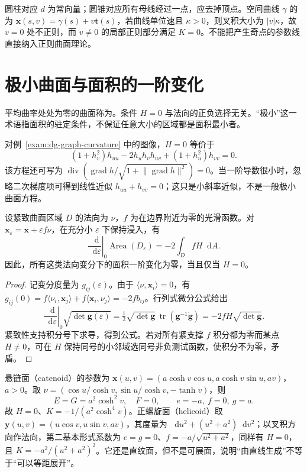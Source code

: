 \documentclass[UTF8,12pt,a4paper,fontset=fandol]{ctexbook}
\newcommand{\dd}{\mathop{}\!\mathrm d}
\newcommand{\ip}[2]{\langle #1,#2\rangle}
\newcommand{\norm}[1]{\lVert #1\rVert}
\DeclareMathOperator{\tr}{tr}
\DeclareMathOperator{\grad}{grad}
\begin{document}
圆柱对应 $d$ 为常向量；圆锥对应所有母线经过一点，应去掉顶点。空间曲线 $\gamma$ 的为 $\mathbf x(s,v)=\gamma(s)+v\mathbf t(s)$，若曲线单位速且 $\kappa>0$，则叉积大小为 $|v|\kappa$，故 $v=0$ 处不正则，而 $v\ne0$ 的局部正则部分满足 $K=0$。不能把产生奇点的参数线直接纳入正则曲面理论。

\section{极小曲面与面积的一阶变化}
\begin{definition}[极小曲面]
平均曲率处处为零的曲面称为。条件 $H=0$ 与法向的正负选择无关。“极小”这一术语指面积的驻定条件，不保证任意大小的区域都是面积最小者。
\end{definition}
对例~\ref{exam:dg-graph-curvature} 中的图像，$H=0$ 等价于
\begin{equation}
 (1+h_v^2)h_{uu}-2h_uh_vh_{uv}+(1+h_u^2)h_{vv}=0.
 \label{eq:dg-minimal-equation}
\end{equation}
该方程还可写为 $\operatorname{div}(\grad h/\sqrt{1+\norm{\grad h}^2})=0$。当一阶导数很小时，忽略二次梯度项可得到线性近似 $h_{uu}+h_{vv}=0$；这只是小斜率近似，不是一般极小曲面方程。

\begin{proposition}[法向变分的面积第一变分]
设紧致曲面区域 $D$ 的法向为 $\nu$，$f$ 为在边界附近为零的光滑函数。对 $\mathbf x_\varepsilon=\mathbf x+\varepsilon f\nu$，在充分小 $\varepsilon$ 下保持浸入，有
\begin{equation}
 \left.\frac{\dd}{\dd\varepsilon}\right|_{0}\operatorname{Area}(D_\varepsilon)
 =-2\int_D fH\dd A.
 \label{eq:dg-area-variation}
\end{equation}
因此，所有这类法向变分下的面积一阶变化为零，当且仅当 $H=0$。
\end{proposition}
\begin{proof}
记变分度量为 $g_{ij}(\varepsilon)$。由于 $\ip\nu{\mathbf x_i}=0$，有 $\dot g_{ij}(0)=f\ip{\nu_i}{\mathbf x_j}+f\ip{\mathbf x_i}{\nu_j}=-2fb_{ij}$。行列式微分公式给出
\[
 \left.\frac{\dd}{\dd\varepsilon}\right|_0\sqrt{\det\mathbf g(\varepsilon)}
 =\tfrac12\sqrt{\det\mathbf g}\,\tr(\mathbf g^{-1}\dot{\mathbf g})
 =-2fH\sqrt{\det\mathbf g}.
\]
紧致性支持积分号下求导，得到公式。若对所有紧支撑 $f$ 积分都为零而某点 $H\ne0$，可在 $H$ 保持同号的小邻域选同号非负测试函数，使积分不为零，矛盾。
\end{proof}

\begin{example}[悬链面与正螺旋面]\label{exam:dg-minimal-models}
悬链面（catenoid）的参数为 $\mathbf x(u,v)=(a\cosh v\cos u,a\cosh v\sin u,av)$，$a>0$。取 $\nu=(\cos u/\cosh v,\sin u/\cosh v,-\tanh v)$，则
\[
 E=G=a^2\cosh^2v,\quad F=0,\qquad e=-a,\ f=0,\ g=a.
\]
故 $H=0$、$K=-1/(a^2\cosh^4v)$。正螺旋面（helicoid）取 $\mathbf y(u,v)=(u\cos v,u\sin v,av)$，其度量为 $\dd u^2+(u^2+a^2)\dd v^2$；以叉积方向作法向，第二基本形式系数为 $e=g=0$、$f=-a/\sqrt{u^2+a^2}$，同样有 $H=0$，且 $K=-a^2/(u^2+a^2)^2$。它还是直纹面，但不是可展面，说明“由直线生成”不等于“可以等距展开”。
\end{example}
\end{document}
